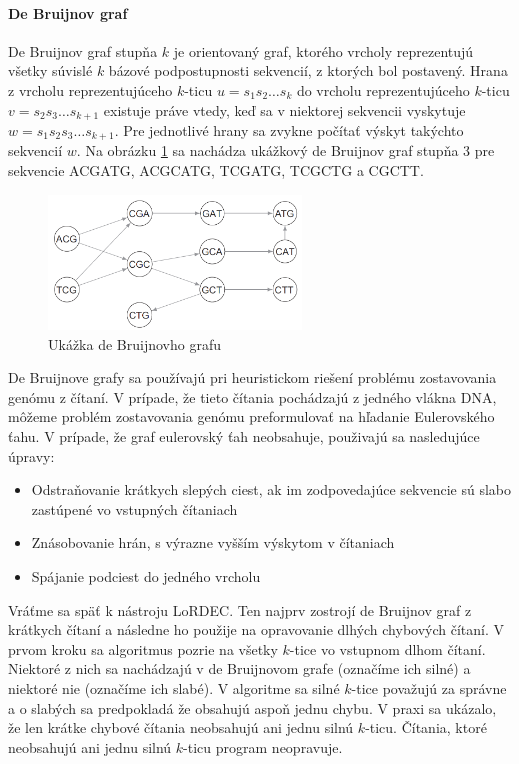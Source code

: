 \paragraph{De Bruijnov graf}

De Bruijnov graf stupňa $k$ je orientovaný graf, ktorého vrcholy reprezentujú všetky súvislé $k$ bázové podpostupnosti sekvencií, z ktorých bol postavený. Hrana z vrcholu reprezentujúceho $k$-ticu $u = s_{1}s_{2}\dots s_{k}$ do vrcholu reprezentujúceho $k$-ticu $v = s_{2}s_{3}\dots s_{k + 1}$ existuje práve vtedy, keď sa v niektorej sekvencii vyskytuje $w = s_{1}s_{2}s_{3}\dots s_{k + 1}$. Pre jednotlivé hrany sa zvykne počítať výskyt takýchto sekvencií $w$. Na obrázku \ref{fig:debruijngraph} sa nachádza ukážkový de Bruijnov graf stupňa 3 pre sekvencie ACGATG, ACGCATG, TCGATG, TCGCTG a CGCTT. 

\begin{figure}
    \centering
    \includegraphics[width=0.6\textwidth]{images/debruijn.png}
    \caption{Ukážka de Bruijnovho grafu}
    \label{fig:debruijngraph}
\end{figure}

De Bruijnove grafy sa používajú pri heuristickom riešení problému zostavovania genómu z čítaní. V prípade, že tieto čítania pochádzajú z jedného vlákna DNA, môžeme problém zostavovania genómu preformulovať na hľadanie Eulerovského ťahu. V prípade, že graf eulerovský ťah neobsahuje, použivajú sa nasledujúce úpravy:
\begin{itemize}
\item Odstraňovanie krátkych slepých ciest, ak im zodpovedajúce sekvencie sú slabo zastúpené vo vstupných čítaniach
\item Znásobovanie hrán, s výrazne vyšším výskytom v čítaniach
\item Spájanie podciest do jedného vrcholu
\end{itemize}

Vráťme sa späť k nástroju LoRDEC. Ten najprv zostrojí de Bruijnov graf z krátkych čítaní a následne ho použije na opravovanie dlhých chybových čítaní. V prvom kroku sa algoritmus pozrie na všetky $k$-tice vo vstupnom dlhom čítaní. Niektoré z nich sa nachádzajú v de Bruijnovom grafe (označíme ich silné) a niektoré nie (označíme ich slabé). V algoritme sa silné $k$-tice považujú za správne a o slabých sa predpokladá že obsahujú aspoň jednu chybu. V praxi sa ukázalo, že len krátke chybové čítania neobsahujú ani jednu silnú $k$-ticu. Čítania, ktoré neobsahujú ani jednu silnú $k$-ticu program neopravuje.

